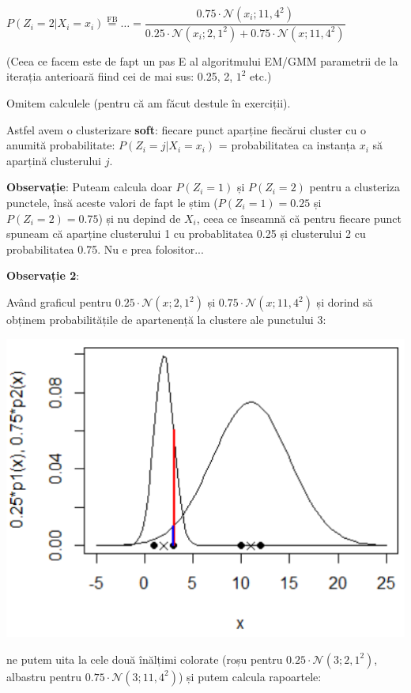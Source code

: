 \documentclass[12pt]{article}
\begin{document}
	$P(Z_i = 2|X_i = x_i) \stackrel{\text{FB}}{=} \dots = \dfrac{0.75\cdot \mathcal{N}(x_i;11,4^2)}{0.25\cdot \mathcal{N}(x_i;2,1^2) + 0.75\cdot\mathcal{N}(x;11,4^2)}$
	
	(Ceea ce facem este de fapt un pas E al algoritmului EM/GMM parametrii de la iterația anterioară fiind cei de mai sus: 0.25, 2, $1^2$ etc.)
	
	Omitem calculele (pentru că am făcut destule în exerciții).
	
	Astfel avem o clusterizare \textbf{soft}: fiecare punct aparține fiecărui cluster cu o anumită probabilitate: $P(Z_i = j|X_i = x_i)$ = probabilitatea ca instanța $x_i$ să aparțină clusterului $j$.
	
	\textbf{Observație}: Puteam calcula doar $P(Z_i = 1)$ și $P(Z_i = 2)$ pentru a clusteriza punctele, însă aceste valori de fapt le știm ($P(Z_i = 1) = 0.25$ și $P(Z_i = 2)=0.75$) și nu depind de $X_i$, ceea ce înseamnă că pentru fiecare punct spuneam că aparține clusterului 1 cu probablitatea 0.25 și clusterului 2 cu probabilitatea 0.75. Nu e prea folositor...
	
	\textbf{Observație 2}: 
	
	Având graficul pentru $0.25 \cdot \mathcal{N}(x;2,1^2)$ și $0.75 \cdot \mathcal{N}(x;11,4^2)$ și dorind să obținem probabilitățile de apartenență la clustere ale punctului 3:
	
	\begin{center}
		\includegraphics{screenshot006}
	\end{center}
		
	ne putem uita la cele două înălțimi colorate (roșu pentru $0.25 \cdot \mathcal{N}(3;2,1^2)$, albastru pentru $0.75 \cdot \mathcal{N}(3;11,4^2)$) și putem calcula rapoartele: 
	
\end{document}
